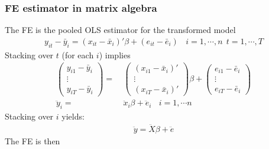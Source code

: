 \documentclass[a4paper,twoside,11pt]{article}
\begin{document}
\subsubsection{FE estimator in matrix algebra}
The FE is the pooled OLS estimator for the transformed model
\begin{equation*}
\begin{aligned}
y_{it} - \bar y_i = (x_{it} - \bar x_i)' \beta + (e_{it} - \bar e_i) \ \ \ \ i =1,\cdots , n \ \ t = 1, \cdots , T
\end{aligned}
\end{equation*}
Stacking over $t$ (for each $i$) implies
\begin{equation*}
\begin{aligned}
\begin{pmatrix}
y_{i1} - \bar y_i \\
\vdots \\
y_{iT} - \bar y_i 
\end{pmatrix} =& \  \begin{pmatrix}
(x_{i1} - \bar x_i )' \\
\vdots \\
(x_{iT} - \bar x_i) ' 
\end{pmatrix} \beta + \begin{pmatrix}
e_{i1} - \bar e_i \\
\vdots \\
e_{iT} - \bar e_i 
\end{pmatrix}
\\
\ddot y_i =& \  \ddot x_i \beta + \ddot e_i \ \ \ \ i =1,\cdots n
\end{aligned}
\end{equation*}
Stacking over $i$ yields:
\begin{equation*}
\begin{aligned}
\ddot y = \ddot X \beta + \ddot e
\end{aligned}
\end{equation*}
The FE is then
\end{document}
